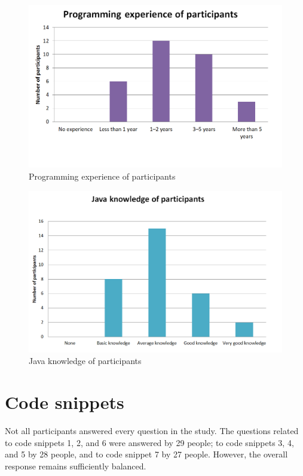 \begin{figure} [H]
  \centering
  \includegraphics[scale=0.8]{figures/p_exp.png}
  \caption{Programming experience of participants}
  \label{fig:AnhangsChor}
\end{figure}


\begin{figure} [H]
  \centering
  \includegraphics[scale=0.85]{figures/java_kn.png}
  \caption{Java knowledge of participants}
  \label{fig:AnhangsChor}
\end{figure}


\section{Code snippets}
Not all participants answered every question in the study. The questions related to code snippets 1, 2, and 6 were answered by 29 people;  to code snippets 3, 4, and 5 by 28 people, and to code snippet 7 by 27 people.  However, the overall response remains sufficiently balanced.


